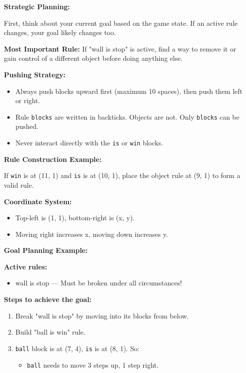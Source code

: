 \begin{GreenBox}
	\textbf{Strategic Planning:}

	First, think about your current goal based on the game state. If an active rule
	changes, your goal likely changes too.

	\textbf{Most Important Rule:} If "wall is stop" is active, find a way to
	remove it or gain control of a different object before doing anything else.

	\textbf{Pushing Strategy:}
	\begin{itemize}
		\item Always push blocks upward first (maximum 10 spaces), then push them
			left or right.

		\item Rule \texttt{blocks} are written in backticks. Objects are not. Only
			\texttt{blocks} can be pushed.

		\item Never interact directly with the \texttt{is} or \texttt{win} blocks.
	\end{itemize}

	\textbf{Rule Construction Example:}

	If \texttt{win} is at (11, 1) and \texttt{is} is at (10, 1), place the object rule
	at (9, 1) to form a valid rule.

	\textbf{Coordinate System:}
	\begin{itemize}
		\item Top-left is (1, 1), bottom-right is (x, y).

		\item Moving right increases x, moving down increases y.
	\end{itemize}

	\textbf{Goal Planning Example:}

	\textbf{Active rules:}
	\begin{itemize}
		\item wall is stop — Must be broken under all circumstances!
	\end{itemize}

	\textbf{Steps to achieve the goal:}
	\begin{enumerate}
		\item Break "wall is stop" by moving into its blocks from below.

		\item Build "ball is win" rule.

		\item \texttt{ball} block is at (7, 4), \texttt{is} is at (8, 1). So:
			\begin{itemize}
				\item \texttt{ball} needs to move 3 steps up, 1 step right.


\end{itemize}
\end{enumerate}
\end{GreenBox}
